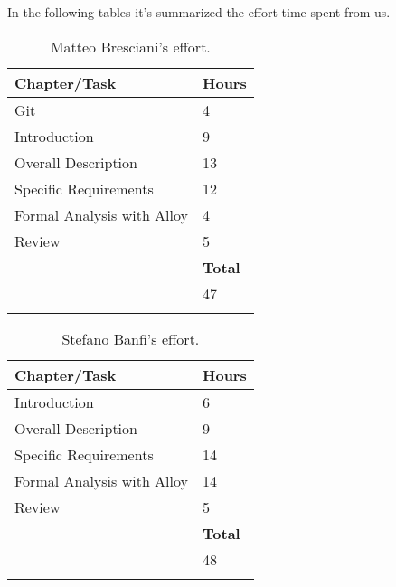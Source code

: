 In the following tables it's summarized the effort time spent from us. 
	\begin{longtable}{| p{5 cm} | p{1 cm} |} 
			\hline
			{\bf Chapter/Task} & {\bf Hours}\\
			\hline
            Git & 4 \\
			Introduction & 9 \\
			Overall Description & 13  \\
			Specific Requirements &  12 \\
			Formal Analysis with Alloy & 4  \\
			Review & 5 \\
			\hline
			&  {\bf Total} \\
			\hline
			&  47 \\
			\hline
			\caption{Matteo Bresciani's effort.}
		\end{longtable}

			\begin{longtable}{| p{5 cm} | p{1 cm} |} 
			\hline
			{\bf Chapter/Task} & {\bf Hours}\\
			\hline
			Introduction & 6 \\
			Overall Description & 9 \\
			Specific Requirements & 14 \\
			Formal Analysis with Alloy & 14 \\
			Review & 5 \\
			\hline
			&  {\bf Total} \\
			\hline
			&  48 \\
			\hline
			\caption{Stefano Banfi's effort.}
		\end{longtable}
	
